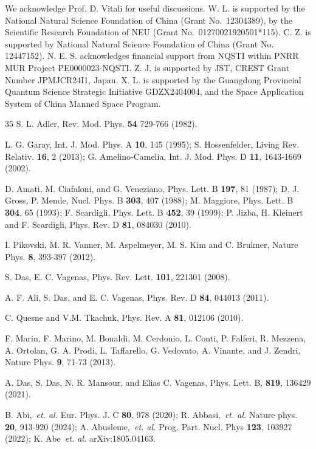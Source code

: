 \documentclass[aps,prl,twocolumn,superscriptaddress]{revtex4-2}
\begin{document}
We acknowledge Prof. D. Vitali for useful discussions. W. L. is supported by the National Natural Science Foundation of China (Grant No.~12304389), by the Scientific Research Foundation of NEU (Grant No.~01270021920501*115). C. Z. is supported by National Natural Science Foundation of China (Grant No. 12447152). N. E. S. acknowledges financial support from NQSTI within PNRR MUR Project PE0000023-NQSTI. Z. J. is supported by JST, CREST Grant Number JPMJCR24I1, Japan. X. L. is supported by the Guangdong Provincial Quantum Science Strategic Initiative GDZX2404004, and the Space Application System of China Manned Space Program.
\begin{thebibliography}{35}
 S. L. Adler, Rev. Mod. Phys. \textbf{54} 729-766 (1982).

 L. G. Garay, Int. J. Mod. Phys. A \textbf{10}, 145 (1995); S. Hossenfelder, Living Rev. Relativ. \textbf{16}, 2 (2013); G. Amelino-Camelia, Int. J. Mod. Phys. D \textbf{11}, 1643-1669 (2002).

 D. Amati, M. Ciafaloni, and G. Veneziano, Phys. Lett. B \textbf{197}, 81 (1987); D. J. Gross, P. Mende, Nucl. Phys. B \textbf{303}, 407 (1988);  M. Maggiore, Phys. Lett. B \textbf{304}, 65 (1993); F. Scardigli, Phys. Lett. B \textbf{452}, 39 (1999); P. Jizba, H. Kleinert and F. Scardigli, Phys. Rev. D \textbf{81}, 084030 (2010).

 I. Pikovski, M. R. Vanner, M. Aspelmeyer, M. S. Kim and C. Brukner, Nature Phys. \textbf{8}, 393-397 (2012).

 S. Das, E. C. Vagenas, Phys. Rev. Lett. \textbf{101}, 221301 (2008).

 A. F. Ali, S. Das, and E. C. Vagenas, Phys. Rev. D  \textbf{84}, 044013 (2011).

 C. Quesne and V.M. Tkachuk, Phys. Rev. A \textbf{81}, 012106 (2010).

 F. Marin, F. Marino, M. Bonaldi, M. Cerdonio, L. Conti, P. Falferi, R. Mezzena, A. Ortolan, G. A. Prodi, L. Taffarello, G. Vedovato, A. Vinante, and J. Zendri, Nature Phys. \textbf{9}, 71-73 (2013).

 A. Das, S. Das, N. R. Mansour,  and Elias C. Vagenas, Phys. Lett. B, \textbf{819}, 136429 (2021).

 B. Abi,~\textit{et. al.} Eur. Phys. J. C \textbf{80}, 978 (2020); R. Abbasi,~\textit{et. al.}  Nature phys. \textbf{20}, 913-920 (2024); A. Abusleme,~\textit{et. al.} Prog. Part. Nucl. Phys \textbf{123}, 103927 (2022);  K. Abe~\textit{et. al.} arXiv:1805.04163.


\end{thebibliography}
\end{document}
